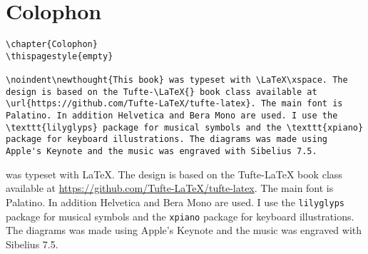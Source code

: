 
\chapter{Colophon}
\thispagestyle{empty}

\begin{fullwidth}

\begin{lstlisting}
\chapter{Colophon}
\thispagestyle{empty}

\noindent\newthought{This book} was typeset with \LaTeX\xspace. The design is based on the Tufte-\LaTeX{} book class available at \url{https://github.com/Tufte-LaTeX/tufte-latex}. The main font is Palatino. In addition Helvetica and Bera Mono are used. I use the \texttt{lilyglyps} package for musical symbols and the \texttt{xpiano} package for keyboard illustrations. The diagrams was made using Apple's Keynote and the music was engraved with Sibelius 7.5.

\end{lstlisting}

\noindent{} was typeset with \LaTeX\xspace. The design is based on the Tufte-\LaTeX{} book class available at \url{https://github.com/Tufte-LaTeX/tufte-latex}. The main font is Palatino. In addition Helvetica and Bera Mono are used. I use the \texttt{lilyglyps} package for musical symbols and the \texttt{xpiano} package for keyboard illustrations. The diagrams was made using Apple's Keynote and the music was engraved with Sibelius 7.5.

\end{fullwidth}


